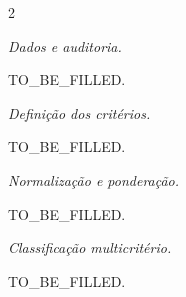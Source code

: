 \documentclass[10pt,a4paper]{article}
\begin{document}
\begin{multicols}{2}
%
%
%


\textit{Dados e auditoria.}

TO\_BE\_FILLED.

%
%


\textit{Definição dos critérios.}

TO\_BE\_FILLED.

%


\textit{Normalização e ponderação.}

TO\_BE\_FILLED.

%


%
%
%
%

%


\textit{Classificação multicritério.}

TO\_BE\_FILLED.

%


%
%
%


\end{multicols}
\end{document}
